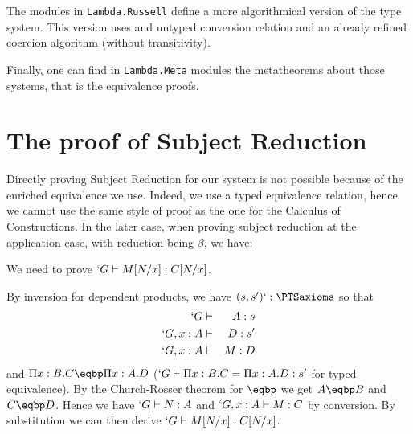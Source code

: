 \documentclass[11pt]{article}
\def\coqmodule#1{\texttt{#1}}
\begin{document}
The modules in \coqmodule{Lambda.Russell} define a more algorithmical
version of the \Russell type system. This version uses and untyped
conversion relation and an already refined coercion algorithm (without
transitivity).

Finally, one can find in \coqmodule{Lambda.Meta} modules the
metatheorems about those systems, that is the equivalence proofs. 


\section*{The proof of Subject Reduction}
Directly proving Subject Reduction for our system is not possible
because of the enriched equivalence we use. Indeed, we use a typed
equivalence relation, hence we cannot use the same style of proof as the
one for the Calculus of Constructions. In the later case, when proving
subject reduction at the application case, with reduction being $\beta$, we have:
\begin{prooftree}
\end{prooftree}

\def\redonebp{"->"_{\beta\pi}}
\def\redbp{"->>"_{\beta\pi}}
\def\redpbp{"->"_{\beta\pi}^+}

We need to prove $`G \type M[N/x] : C[N/x]$.

By inversion for dependent products, we have $(s, s') `: \PTSaxioms$ so that
\begin{eqnarray*}
  `G & \type & A : s \\
  `G, x : A & \type & D : s' \\
  `G, x : A & \type & M : D
\end{eqnarray*}
and $\Pi x : B.C \eqbp \Pi x : A.D$ ($`G \type \Pi x : B.C = \Pi x : A.D
: s'$ for typed equivalence). By the Church-Rosser theorem for $\eqbp$ we
get $A \eqbp B$ and $C \eqbp D$. Hence we have $`G \type N : A$ and $`G, x
: A \type M : C$ by conversion. By substitution we can then derive
$`G \type M[N/x] : C[N/x]$.
\end{document}
